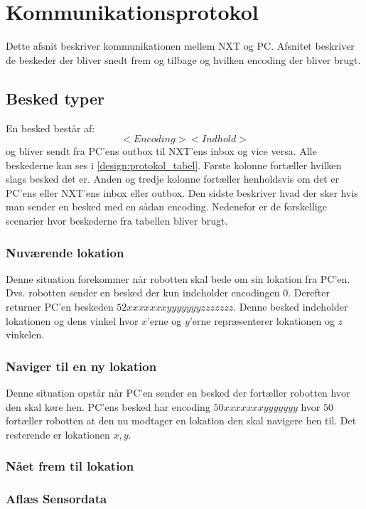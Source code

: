\section{Kommunikationsprotokol}
Dette afsnit beskriver kommunikationen mellem NXT og PC.
Afsnitet beskriver de beskeder der bliver snedt frem og tilbage og hvilken encoding der bliver brugt.

\subsection{Besked typer}
En besked består af:
\begin{equation}
<Encoding><Indhold>
\end{equation}
og bliver sendt fra PC'ens outbox til NXT'ens inbox og vice versa.
Alle beskederne kan ses i \cref{design:protokol_tabel}.
Første kolonne fortæller hvilken slags besked det er.
Anden og tredje kolonne fortæller henholdsvis om det er PC'ens eller NXT'ens inbox eller outbox.
Den sidste beskriver hvad der sker hvis man sender en besked med en sådan encoding.
Nedenefor er de forskellige scenarier hvor beskederne fra tabellen bliver brugt.
\subsubsection{Nuværende lokation}
Denne situation forekommer når robotten skal bede om sin lokation fra PC'en.
Dvs. robotten sender en besked der kun indeholder encodingen $0$.
Derefter returner PC'en beskeden $52xxxxxxxyyyyyyyzzzzzzz$.
Denne besked indeholder lokationen og dens vinkel hvor $x$'erne og $y$'erne repræsenterer lokationen og $z$ vinkelen.
\subsubsection{Naviger til en ny lokation}
Denne situation opstår når PC'en sender en besked der fortæller robotten hvor den skal køre hen.
PC'ens besked har encoding $50xxxxxxxyyyyyyy$ hvor $50$ fortæller robotten at den nu modtager en lokation den skal navigere hen til.
Det resterende er lokationen $x,y$.
\subsubsection{Nået frem til lokation}
\subsubsection{Aflæs Sensordata}

